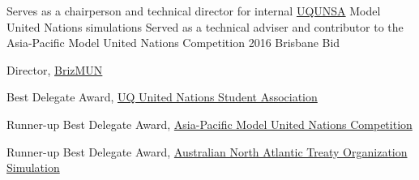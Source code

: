 \documentclass[a4paper,10pt,oneside]{article}
\begin{document}
\begin{body}
\begin{detail}
\BulletItem Serves as a chairperson and technical director for internal \href{http://www.unsauq.org/}{UQUNSA} Model United Nations simulations 
\BulletItem Served as a technical adviser and contributor to the Asia-Pacific Model United Nations Competition 2016 Brisbane Bid
\end{detail}

\par Director, \href{http://www.brizmun.com/}{BrizMUN} \hfill {}
\par Best Delegate Award, \href{http://www.unsauq.org/}{UQ United Nations Student Association} \hfill {}
\par Runner-up Best Delegate Award, \href{http://www.amunc.net/}{Asia-Pacific Model United Nations Competition} \hfill {}
\par Runner-up Best Delegate Award, \href{http://www.ausnatos.org/}{Australian North Atlantic Treaty Organization Simulation} \hfill {}









\end{body}
\end{document}
